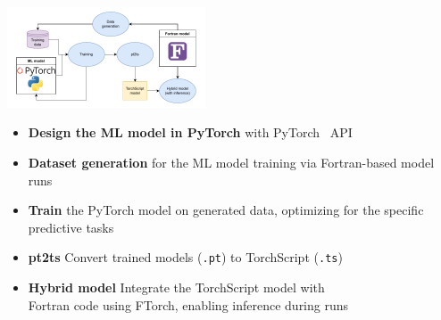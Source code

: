 \begin{tikzfigure}
    \includegraphics[width=0.44\textwidth]{figures/offline-training-diagram.pdf}
\end{tikzfigure}
\begin{itemize}
    \item \textbf{Design the ML model in PyTorch} with PyTorch \faPython~API
    
    \item \textbf{Dataset generation} for the ML model training via Fortran-based model runs
    
    \item \textbf{Train} the PyTorch model on generated data, optimizing for the specific predictive tasks
    
    \item \textbf{pt2ts} Convert trained  models (\texttt{.pt}) to TorchScript (\texttt{.ts})
    
    \item \textbf{Hybrid model} Integrate the TorchScript model with\\ Fortran code using FTorch, enabling inference during runs
\end{itemize}
